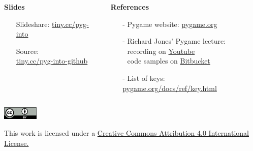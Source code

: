 \documentclass[handout]{beamer}   %
\begin{document}
\begin{frame}[fragile]
\begin{columns}[t]
\begin{column}{0.44\textwidth}
      \vspace{0.38cm}
      \textbf{Slides}
      \normalsize
      \vspace{0.18cm}
      \begin{itemize}%
        \setlength{\itemindent}{-0.3cm}
        \item[] Slideshare: %
          \href{http://tiny.cc/pyg-into}{tiny.cc/pyg-into}
        \item[] Source: \\%
          \href{http://tiny.cc/pyg-into-github}{tiny.cc/pyg-into-github}
      \end{itemize}
    \end{column}
    \begin{column}{0.61\textwidth}
      \textbf{References}
      \vspace{0.28cm}
      \normalsize 
      \begin{itemize}%
        \itemsep9pt
        \item[-] Pygame website: \href{http://pygame.org}{pygame.org}
        \item[-] Richard Jones' Pygame lecture: \\
          \textcolor{white}{-} 
          recording on \href{%
            https://www.youtube.com/watch?v=mTmJfWdZzbo}{Youtube}\\
          \textcolor{white}{-} code samples on \href{%
            https://bitbucket.org/r1chardj0n3s/pygame-tutorial/src}{Bitbucket}
        \item[-] List of keys: \href{http://www.pygame.org/docs/ref/key.html}{pygame.org/docs/ref/key.html}

      \end{itemize}
    \end{column}
  \end{columns}

  \vspace{0.18cm}

  \begin{center}
    \includegraphics[width=1.7cm]{img/ccby40.png}

    \vspace{0.1cm}

    \scriptsize This work is licensed under a
    \href{https://creativecommons.org/licenses/by/4.0/}{Creative
      Commons Attribution 4.0 International License.}
  \end{center}

\end{frame}
\end{document}
